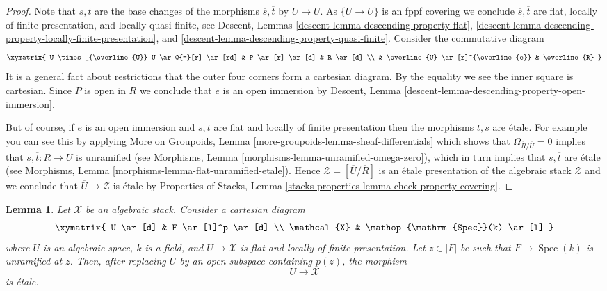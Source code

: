 \documentclass{stacks-project}
\theoremstyle{plain}
\newtheorem{lemma}[subsection]{Lemma}
\theoremstyle{definition}
\theoremstyle{remark}
\numberwithin{equation}{subsection}
\def\Spec{\mathop{\mathrm{Spec}}}
\begin{document}
\begin{proof}
\medskip\noindent
Note that $s, t$ are the base changes of the morphisms
$\overline{s}, \overline{t}$ by $U \to \overline{U}$.
As $\{U \to \overline{U}\}$ is an fppf covering we conclude
$\overline{s}, \overline{t}$ are flat, locally of finite presentation, and
locally quasi-finite, see
Descent, Lemmas \ref{descent-lemma-descending-property-flat},
\ref{descent-lemma-descending-property-locally-finite-presentation}, and
\ref{descent-lemma-descending-property-quasi-finite}.
Consider the commutative diagram
$$
\xymatrix{
U \times_{\overline{U}} U \ar@{=}[r] \ar[rd] & P \ar[r] \ar[d] & R \ar[d] \\
& \overline{U} \ar[r]^{\overline{e}} & \overline{R}
}
$$
It is a general fact about restrictions that the outer four corners
form a cartesian diagram. By the equality we see the inner square is
cartesian. Since $P$ is open in $R$ we conclude that $\overline{e}$
is an open immersion by
Descent, Lemma \ref{descent-lemma-descending-property-open-immersion}.

\medskip\noindent
But of course, if $\overline{e}$ is an open immersion and
$\overline{s}, \overline{t}$ are flat and locally of finite presentation
then the morphisms $\overline{t}, \overline{s}$ are \'etale.
For example you can see this by applying
More on Groupoids, Lemma \ref{more-groupoids-lemma-sheaf-differentials}
which shows that $\Omega_{\overline{R}/\overline{U}} = 0$
implies that $\overline{s}, \overline{t} : \overline{R} \to \overline{U}$
is unramified (see
Morphisms, Lemma \ref{morphisms-lemma-unramified-omega-zero}),
which in turn implies that $\overline{s}, \overline{t}$ are \'etale
(see
Morphisms, Lemma \ref{morphisms-lemma-flat-unramified-etale}).
Hence $\mathcal{Z} = [\overline{U}/\overline{R}]$ is an \'etale
presentation of the algebraic stack $\mathcal{Z}$ and we conclude that
$\overline{U} \to \mathcal{Z}$ is \'etale by
Properties of Stacks, Lemma
\ref{stacks-properties-lemma-check-property-covering}.
\end{proof}

\begin{lemma}
\label{lemma-etale-at-point}
Let $\mathcal{X}$ be an algebraic stack. Consider a cartesian diagram
$$
\xymatrix{
U \ar[d] & F \ar[l]^p \ar[d] \\
\mathcal{X} & \Spec(k) \ar[l]
}
$$
where $U$ is an algebraic space, $k$ is a field, and $U \to \mathcal{X}$
is flat and locally of finite presentation. Let $z \in |F|$ be such that
$F \to \Spec(k)$ is unramified at $z$. Then, after replacing $U$ by
an open subspace containing $p(z)$, the morphism
$$
U \longrightarrow \mathcal{X}
$$
is \'etale.
\end{lemma}
\end{document}
